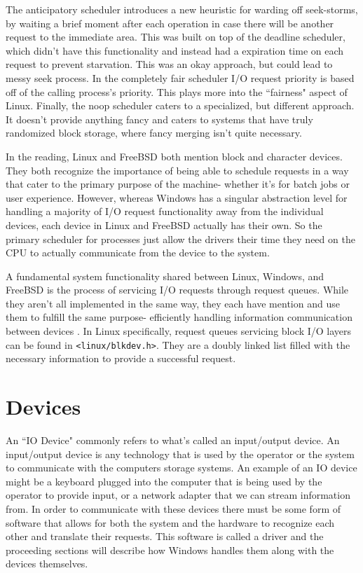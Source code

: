 \documentclass[10pt,draftclsnofoot,onecolumn]{IEEEtran}
\begin{document}
\par The anticipatory scheduler introduces a new heuristic for warding off seek-storms, by waiting a brief moment after each operation in case there will be another request to the immediate area.
This was built on top of the deadline scheduler, which didn't have this functionality and instead had a expiration time on each request to prevent starvation.
This was an okay approach, but could lead to messy seek process.
In the completely fair scheduler I/O request priority is based off of the calling process's priority.
This plays more into the ``fairness" aspect of Linux.
Finally, the noop scheduler caters to a specialized, but different approach.
It doesn't provide anything fancy and caters to systems that have truly randomized block storage, where fancy merging isn't quite necessary.

\par In the reading, Linux and FreeBSD both mention block and character devices.
They both recognize the importance of being able to schedule requests in a way that cater to the primary purpose of the machine- whether it's for batch jobs or user experience.
However, whereas Windows has a singular abstraction level for handling a majority of I/O request functionality away from the individual devices, each device in Linux and FreeBSD actually has their own.
So the primary scheduler for processes just allow the drivers their time they need on the CPU to actually communicate from the device to the system.

\par A fundamental system functionality shared between Linux, Windows, and FreeBSD is the process of servicing I/O requests through request queues.
While they aren't all implemented in the same way, they each have mention and use them to fulfill the same purpose- efficiently handling information communication between devices \cite{bsd:1} \cite{win:2} \cite{linux:1}.
In Linux specifically, request queues servicing block I/O layers can be found in \texttt{<linux/blkdev.h>}.
They are a doubly linked list filled with the necessary information to provide a successful request.


\section{Devices}
\label{sec:Devices}
\par An ``IO Device" commonly refers to what's called an input/output device.
An input/output device is any technology that is used by the operator or the system to communicate with the computers storage systems.
An example of an IO device might be a keyboard plugged into the computer that is being used by the operator to provide input, or a network adapter that we can stream information from.
In order to communicate with these devices there must be some form of software that allows for both the system and the hardware to recognize each other and translate their requests.
This software is called a driver and the proceeding sections will describe how Windows handles them along with the devices themselves.
\end{document}

